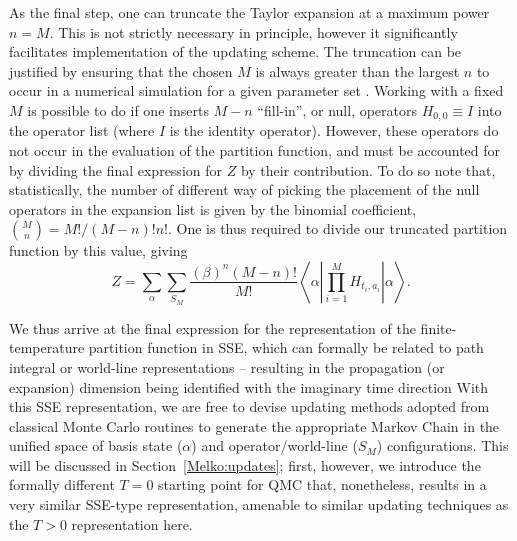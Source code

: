 \documentclass[vecphys]{svmult}
\begin{document}
As the final step, one can truncate the Taylor expansion at a maximum power $n=M$.  This is not strictly necessary in principle, however it significantly facilitates implementation of the updating scheme.  The truncation can be justified 
by ensuring that the chosen $M$ is always greater than the largest $n$ to occur in a numerical simulation for a given parameter set \cite{Melko:SandvikHeis}.  
Working with a fixed $M$ is possible to do if one inserts $M-n$ ``fill-in'', or null, operators $H_{0,0} \equiv I$ into the operator list (where $I$ is the identity operator).  However, these operators do not occur in the evaluation of the partition function, and must be accounted for by dividing the final expression for $Z$ by their contribution.  To do so note that, statistically, the number of different way of picking the placement of the null operators in the expansion list is given by the binomial coefficient,
${M \choose n}= M!/(M-n)!n!$.  One is thus required to divide our truncated partition function by this value, giving\begin{equation}Z=\sum_{\alpha} \sum_{S_M} \frac{ (\beta)^n (M-n)!}{M !}  \left\langle{\alpha \left| \prod_{i=1}^{M} {H_{t_i,a_i}} \right| \alpha   }\right\rangle.
 \label{Zsse3}
\end{equation}

We thus arrive at the final expression for the representation of the finite-temperature partition function in SSE, which 
can formally be related to path integral or world-line representations -- resulting in the propagation (or expansion) dimension being identified with the imaginary time direction \cite{Melko:HK,Melko:Assaad07}
With this SSE representation, we are free to devise updating methods adopted from classical Monte Carlo routines to generate the appropriate Markov Chain in the unified space of  basis state ($\alpha$) and operator/world-line ($S_M$) configurations.  This will be discussed in Section~\ref{Melko:updates}; first, however, we introduce the formally different $T=0$ starting point for QMC that, nonetheless, results in a very similar SSE-type representation, amenable to similar updating techniques as the $T > 0$ representation here.
\end{document}
